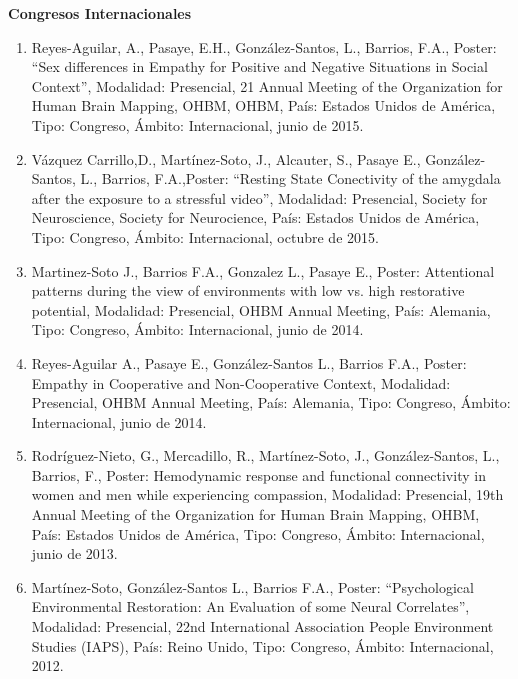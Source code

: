{\large \textbf{Congresos Internacionales}}

\hrulefill

\begin{enumerate}

\item Reyes-Aguilar, A., Pasaye, E.H., González-Santos, L., Barrios, F.A., Poster: “Sex differences in Empathy 
for 
Positive and Negative Situations in Social Context”, Modalidad: Presencial, 21 Annual Meeting of the 
Organization for Human Brain Mapping, OHBM, OHBM, País: Estados Unidos de América, Tipo: Congreso, Ámbito: 
Internacional, junio de 2015.

\item Vázquez Carrillo,D., Martínez-Soto, J., Alcauter, S., Pasaye E., González-Santos, L., Barrios, 
F.A.,Poster: 
“Resting State Conectivity of the amygdala after the exposure to a stressful video”, Modalidad: Presencial, 
Society for Neuroscience, Society for Neurocience, País: Estados Unidos de América, Tipo: Congreso, Ámbito: 
Internacional, octubre de 2015.

\item Martinez-Soto J., Barrios F.A., Gonzalez L., Pasaye E., Poster: Attentional patterns during the view of 
environments with low vs. high restorative potential, Modalidad: Presencial, OHBM Annual Meeting, País: 
Alemania, Tipo: Congreso, Ámbito: Internacional, junio de 2014.

\item Reyes-Aguilar A., Pasaye E., González-Santos L., Barrios F.A., Poster: Empathy in Cooperative and 
Non-Cooperative Context, Modalidad: Presencial, OHBM Annual Meeting, País: Alemania, Tipo: Congreso, Ámbito: 
Internacional, junio de 2014.

\item Rodríguez-Nieto, G., Mercadillo, R., Martínez-Soto, J., González-Santos, L., Barrios, F., Poster: 
Hemodynamic 
response and functional connectivity in women and men while experiencing compassion, Modalidad: Presencial, 
19th Annual Meeting of the Organization for Human Brain Mapping, OHBM, País: Estados Unidos de América, Tipo: 
Congreso, Ámbito: Internacional, junio de 2013.

\item Martínez-Soto, González-Santos L., Barrios F.A., Poster: “Psychological Environmental Restoration: An 
Evaluation of some Neural Correlates”, Modalidad: Presencial, 22nd International Association People 
Environment Studies (IAPS), País: Reino Unido, Tipo: Congreso, Ámbito: Internacional, 2012.


\end{enumerate}
